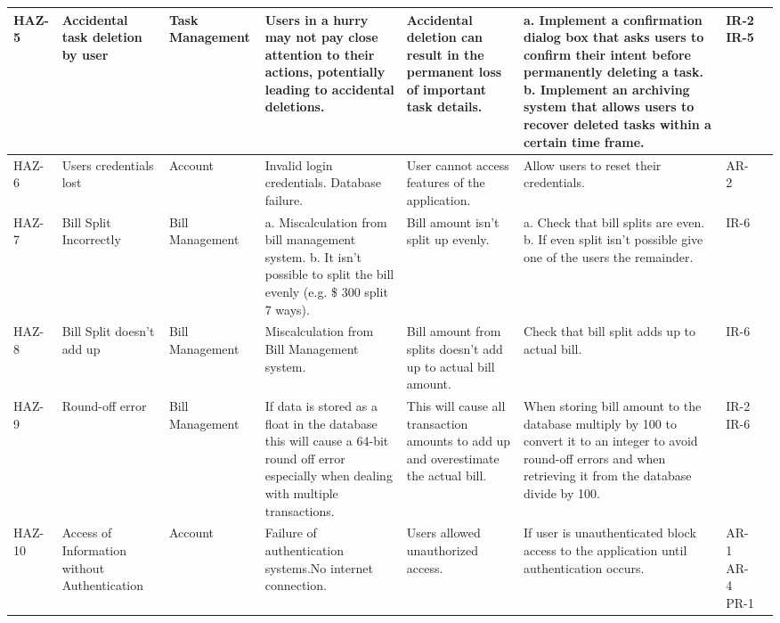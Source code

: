 \documentclass{article}
\begin{document}
\begin{center}
\begin{longtable}{|p{1.5cm}|p{2cm}|p{2cm}|p{3cm}|p{3.5cm}|p{4cm}|p{1cm}|p{1cm}|}
HAZ-5 & Accidental task deletion by user & Task Management & Users in a hurry may not pay close attention to their actions, potentially leading to accidental deletions.  & Accidental deletion can result in the permanent loss of important task details. & a. Implement a confirmation dialog box that asks users to confirm their intent before permanently deleting a task. \newline b. Implement an archiving system that allows users to recover deleted tasks within a certain time frame. & IR-2 \newline IR-5 \\ \hline
HAZ-6 & Users credentials lost & Account & Invalid login credentials. \newline Database failure.  & User cannot access features of the application. & Allow users to reset their credentials. & AR-2\\ \hline
HAZ-7 & Bill Split Incorrectly & Bill Management  & a. Miscalculation from bill management system. \newline b. It isn't possible to split the bill evenly (e.g. \$ 300 split 7 ways). & Bill amount isn't split up evenly. & a. Check that bill splits are even. \newline b. If even split isn't possible give one of the users the remainder. & IR-6 \\ \hline
HAZ-8 & Bill Split doesn't add up  & Bill Management & Miscalculation from Bill Management system. & Bill amount from splits doesn't add up to actual bill amount. & Check that bill split adds up to actual bill. & IR-6\\ \hline
HAZ-9 & Round-off error &  Bill Management &  If data is stored as a float in the database this will cause a 64-bit round off error especially when dealing with multiple transactions.  & This will cause all transaction amounts to add up and overestimate the actual bill.  & When storing bill amount to the database multiply by 100 to convert it to an integer to avoid round-off errors and when retrieving it from the database divide by 100. & IR-2 \newline IR-6 \\ \hline
HAZ-10 & Access of Information without Authentication & Account & Failure of authentication systems.\newline No internet connection.  & Users allowed unauthorized access. & If user is unauthenticated block access to the application until authentication occurs. & AR-1 \newline AR-4 \newline PR-1 \\ \hline

\end{longtable}
\end{center}
\end{document}
